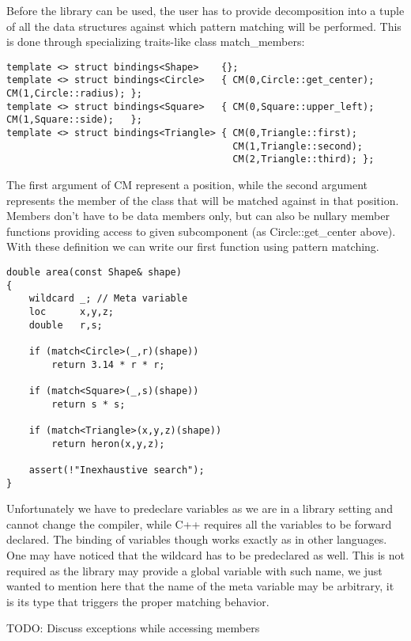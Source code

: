 \documentclass[preprint]{sigplanconf}
\begin{document}
Before the library can be used, the user has to provide decomposition into a 
tuple of all the data structures against which pattern matching will be 
performed. This is done through specializing traits-like class match\_members:

\begin{lstlisting}
template <> struct bindings<Shape>    {};
template <> struct bindings<Circle>   { CM(0,Circle::get_center); CM(1,Circle::radius); };
template <> struct bindings<Square>   { CM(0,Square::upper_left); CM(1,Square::side);   };
template <> struct bindings<Triangle> { CM(0,Triangle::first);    
                                        CM(1,Triangle::second); 
                                        CM(2,Triangle::third); };
\end{lstlisting}

The first argument of CM represent a position, while the second argument 
represents the member of the class that will be matched against in that position. 
Members don't have to be data members only, but can also be nullary member 
functions providing access to given subcomponent (as Circle::get\_center above).
With these definition we can write our first function using pattern matching.

\begin{lstlisting}
double area(const Shape& shape)
{
    wildcard _; // Meta variable
    loc      x,y,z;
    double   r,s;

    if (match<Circle>(_,r)(shape))
        return 3.14 * r * r;

    if (match<Square>(_,s)(shape))
        return s * s;

    if (match<Triangle>(x,y,z)(shape))
        return heron(x,y,z);

    assert(!"Inexhaustive search");
}
\end{lstlisting}

Unfortunately we have to predeclare variables as we are in a library setting and 
cannot change the compiler, while C++ requires all the variables to be forward 
declared. The binding of variables though works exactly as in other languages. 
One may have noticed that the wildcard has to be predeclared as well. This is 
not required as the library may provide a global variable with such name, we 
just wanted to mention here that the name of the meta variable may be arbitrary, 
it is its type that triggers the proper matching behavior.

TODO: Discuss exceptions while accessing members
\end{document}
